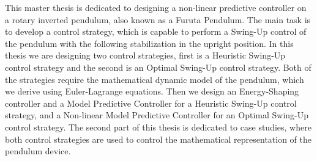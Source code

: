 This master thesis is dedicated to designing a non-linear predictive controller on a rotary inverted pendulum, also known as a Furuta Pendulum. The main task is to develop a control strategy, which is capable to perform a Swing-Up control of the pendulum with the following stabilization in the upright position. In this thesis we are designing two control strategies, first is a Heuristic Swing-Up control strategy and the second is an Optimal Swing-Up control strategy. Both of the strategies require the mathematical dynamic model of the pendulum, which we derive using Euler-Lagrange equations. Then we design an Energy-Shaping controller and a Model Predictive Controller for a Heuristic Swing-Up control strategy, and a Non-linear Model Predictive Controller for an Optimal Swing-Up control strategy. The second part of this thesis is dedicated to case studies, where both control strategies are used to control the mathematical representation of the pendulum device.
